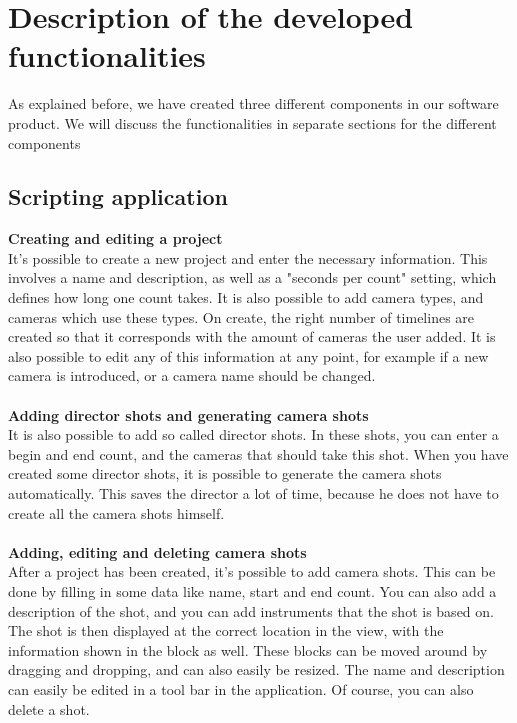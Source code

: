 \section{Description of the developed functionalities}

As explained before, we have created three different components in our software product. We will discuss the functionalities in separate sections for the different components

\subsection{Scripting application}
\textbf{Creating and editing a project}\\
It's possible to create a new project and enter the necessary information. This involves a name and description, as well as a "seconds per count" setting, which defines how long one count takes. It is also possible to add camera types, and cameras which use these types. On create, the right number of timelines are created so that it corresponds with the amount of cameras the user added. It is also possible to edit any of this information at any point, for example if a new camera is introduced, or a camera name should be changed.\\\\
\textbf{Adding director shots and generating camera shots}\\
It is also possible to add so called director shots. In these shots, you can enter a begin and end count, and the cameras that should take this shot. When you have created some director shots, it is possible to generate the camera shots automatically. This saves the director a lot of time, because he does not have to create all the camera shots himself.\\\\
\textbf{Adding, editing and deleting camera shots}\\
After a project has been created, it's possible to add camera shots. This can be done by filling in some data like name, start and end count. You can also add a description of the shot, and you can add instruments that the shot is based on. The shot is then displayed at the correct location in the view, with the information shown in the block as well. These blocks can be moved around by dragging and dropping, and can also easily be resized. The name and description can easily be edited in a tool bar in the application. Of course, you can also delete a shot.\\\\
